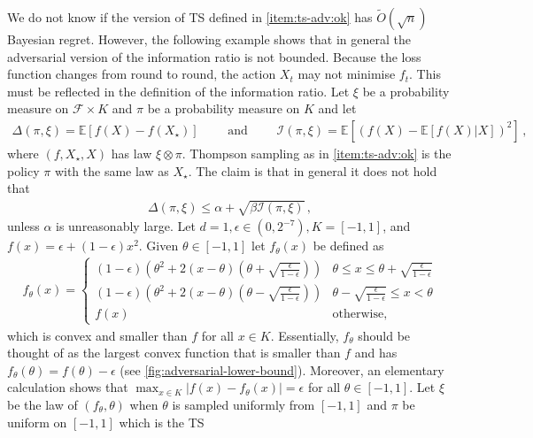 \documentclass[letter, 12pt]{report}
\newcommand{\E}{\mathbb E}
\newcommand{\sF}{\mathscr F}
\newcommand{\I}{\mathcal{I}}
\newcommand{\1}{\mathbf{1}}
\newcommand{\ts}{\textsc{TS}\xspace}
\theoremstyle{plain}
\theoremstyle{definition}
\theoremstyle{remark}
\begin{document}
We do not know if the version of \ts{} defined in \ref{item:ts-adv:ok} has $\tilde O(\sqrt{n})$ Bayesian regret.
However, the following example shows that in general the adversarial version of the information ratio is not bounded.
Because the loss function changes from round to round, the action $X_t$ may not minimise $f_t$. This must be reflected in the definition of the information
ratio. Let $\xi$ be a probability measure on $\sF \times K$ and $\pi$ be a probability measure on $K$ and let
\begin{align*}
    \Delta(\pi, \xi) = \E[f(X) - f(X_\star)]  \qquad \text{ and } \qquad
    \I(\pi, \xi) = \E[(f(X) - \E[f(X)|X])^2]\,,
\end{align*}
where $(f, X_\star, X)$ has law $\xi \otimes \pi$.
Thompson sampling as in \cref{item:ts-adv:ok} is the policy $\pi$ with the same law as $X_\star$. The claim is that in general it does not hold
that
\begin{align*}
    \Delta(\pi, \xi) \leq \alpha + \sqrt{\beta \I(\pi, \xi)}\,,
\end{align*}
unless $\alpha$ is unreasonably large.
Let $d = 1, \epsilon \in (0, 2^{-7}), K = [-1,1]$, and $f(x) = \epsilon + (1 - \epsilon) x^2$.
Given $\theta \in [-1,1]$ let $f_\theta(x)$ be defined as
\begin{align*}
    f_\theta(x) = \begin{cases}
                      (1-\epsilon) (\theta^2 + 2 (x - \theta)(\theta + \sqrt{\frac{\epsilon}{1-\epsilon}}))
                           & \theta \leq x \leq \theta + \sqrt{\frac{\epsilon}{1-\epsilon}} \\
                      (1-\epsilon) (\theta^2 + 2 (x - \theta)(\theta - \sqrt{\frac{\epsilon}{1-\epsilon}}))
                           & \theta - \sqrt{\frac{\epsilon}{1-\epsilon}} \leq x < \theta    \\
                      f(x) & \text{otherwise},
                  \end{cases}
\end{align*}
which is convex and smaller than $f$ for all $x \in K$.
Essentially, $f_\theta$ should be thought of as the largest convex function
that is smaller than $f$ and has $f_\theta(\theta) = f(\theta) - \epsilon$
(see \cref{fig:adversarial-lower-bound}).
Moreover, an elementary calculation shows that $\max_{x \in K} |f(x) - f_\theta(x)| = \epsilon$ for all $\theta \in [-1,1]$.
Let $\xi$ be the law of $(f_\theta, \theta)$ when $\theta$ is sampled uniformly from $[-1,1]$ and $\pi$ be uniform on $[-1,1]$ which is the \ts{}
\end{document}
